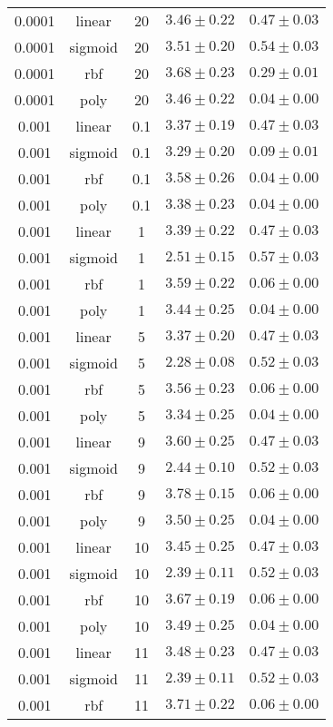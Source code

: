 \begin{tabular}{cccrr}
0.0001 & linear & 20 & $3.46 \pm 0.22$ & $0.47 \pm 0.03$\\
0.0001 & sigmoid & 20 & $3.51 \pm 0.20$ & $0.54 \pm 0.03$\\
0.0001 & rbf & 20 & $3.68 \pm 0.23$ & $0.29 \pm 0.01$\\
0.0001 & poly & 20 & $3.46 \pm 0.22$ & $0.04 \pm 0.00$\\
0.001 & linear & 0.1 & $3.37 \pm 0.19$ & $0.47 \pm 0.03$\\
0.001 & sigmoid & 0.1 & $3.29 \pm 0.20$ & $0.09 \pm 0.01$\\
0.001 & rbf & 0.1 & $3.58 \pm 0.26$ & $0.04 \pm 0.00$\\
0.001 & poly & 0.1 & $3.38 \pm 0.23$ & $0.04 \pm 0.00$\\
0.001 & linear & 1 & $3.39 \pm 0.22$ & $0.47 \pm 0.03$\\
0.001 & sigmoid & 1 & $2.51 \pm 0.15$ & $0.57 \pm 0.03$\\
0.001 & rbf & 1 & $3.59 \pm 0.22$ & $0.06 \pm 0.00$\\
0.001 & poly & 1 & $3.44 \pm 0.25$ & $0.04 \pm 0.00$\\
0.001 & linear & 5 & $3.37 \pm 0.20$ & $0.47 \pm 0.03$\\
0.001 & sigmoid & 5 & $2.28 \pm 0.08$ & $0.52 \pm 0.03$\\
0.001 & rbf & 5 & $3.56 \pm 0.23$ & $0.06 \pm 0.00$\\
0.001 & poly & 5 & $3.34 \pm 0.25$ & $0.04 \pm 0.00$\\
0.001 & linear & 9 & $3.60 \pm 0.25$ & $0.47 \pm 0.03$\\
0.001 & sigmoid & 9 & $2.44 \pm 0.10$ & $0.52 \pm 0.03$\\
0.001 & rbf & 9 & $3.78 \pm 0.15$ & $0.06 \pm 0.00$\\
0.001 & poly & 9 & $3.50 \pm 0.25$ & $0.04 \pm 0.00$\\
0.001 & linear & 10 & $3.45 \pm 0.25$ & $0.47 \pm 0.03$\\
0.001 & sigmoid & 10 & $2.39 \pm 0.11$ & $0.52 \pm 0.03$\\
0.001 & rbf & 10 & $3.67 \pm 0.19$ & $0.06 \pm 0.00$\\
0.001 & poly & 10 & $3.49 \pm 0.25$ & $0.04 \pm 0.00$\\
0.001 & linear & 11 & $3.48 \pm 0.23$ & $0.47 \pm 0.03$\\
0.001 & sigmoid & 11 & $2.39 \pm 0.11$ & $0.52 \pm 0.03$\\
0.001 & rbf & 11 & $3.71 \pm 0.22$ & $0.06 \pm 0.00$\\

\end{tabular}
